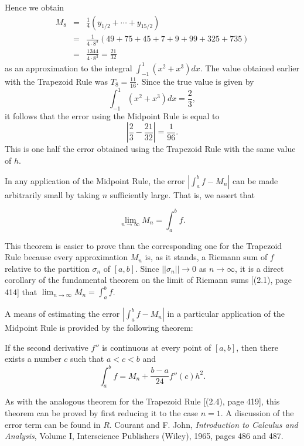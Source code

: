 \begin{example}

\noindent Hence we obtain  
\begin{eqnarray*} 
M_8 &=& \frac{1}{4}(y_{1/2} + \cdots  + y_{15/2})\\
&=& \frac{1}{4 \cdot 8^3} (49 + 75 + 45 + 7 + 9 + 99 + 325 + 735) \\
&=& \frac{1344}{ 4 \cdot 8^3} = \frac{21}{32}
\end{eqnarray*} 
\noindent as an approximation to the integral $\int_{-1}^1 (x^2 + x^3) dx$. The value obtained earlier with the Trapezoid Rule was $T_8 = \frac{11}{16}$. Since the true value is given by
$$
\int_{-1}^1 (x^2 + x^3) dx = \frac{2}{3},
$$
\noindent it follows that the error using the Midpoint Rule is equal to
$$
| \frac{2}{3} - \frac{21}{32} | = \frac{1}{96} .
$$
\noindent This is one half the error obtained using the Trapezoid Rule with the same value of $h$.
\end{example}

In any application of the Midpoint Rule, the error $| \int_a^b f - M_n |$ can be made arbitrarily small by taking $n$ sufficiently large. That is, we assert that

\begin{theorem} %
$$
\lim_{n \rightarrow \infty} M_n = \int_a^b f .
$$
\end{theorem}

This theorem is easier to prove than the corresponding one for the Trapezoid Rule because every approximation $M_n$ is, as it stands, a Riemann sum of $f$ relative to the partition $\sigma_n$ of $[a, b]$. Since $|| \sigma_n || \rightarrow 0$ as $n \rightarrow \infty$, it is a direct corollary of the fundamental theorem on the limit of Riemann sums [(2.1), page 414] that $\lim_{n \rightarrow \infty} M_n = \int_a^b f$.

A means of estimating the error $| \int_a^b f - M_n |$ in a particular application of the Midpoint Rule is provided by the following theorem:

\begin{theorem} %
If the second derivative $f''$ is continuous at every point of $[a, b]$, then there exists a number $c$ such that $a < c < b$ and
$$
\int_a^b f = M_n + \frac{b -  a}{24} f''(c) h^2.
$$
\end{theorem}

As with the analogous theorem for the Trapezoid Rule [(2.4), page 419], this theorem can be proved by first reducing it to the case $n = 1$. A discussion of the error term can be found in $R$.  Courant and F. John, \textit{Introduction to Calculus and Analysis}, Volume I, Interscience Publishers (Wiley), 1965, pages 486 and 487.

